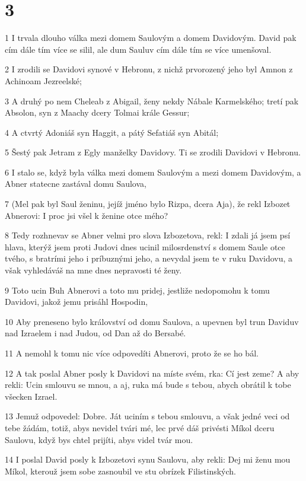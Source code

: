 \chapter{3}

\par 1 I trvala dlouho válka mezi domem Saulovým a domem Davidovým. David pak cím dále tím více se silil, ale dum Sauluv cím dále tím se více umenšoval.
\par 2 I zrodili se Davidovi synové v Hebronu, z nichž prvorozený jeho byl Amnon z Achinoam Jezreelské;
\par 3 A druhý po nem Cheleab z Abigail, ženy nekdy Nábale Karmelského; tretí pak Absolon, syn z Maachy dcery Tolmai krále Gessur;
\par 4 A ctvrtý Adoniáš syn Haggit, a pátý Sefatiáš syn Abitál;
\par 5 Šestý pak Jetram z Egly manželky Davidovy. Ti se zrodili Davidovi v Hebronu.
\par 6 I stalo se, když byla válka mezi domem Saulovým a mezi domem Davidovým, a Abner statecne zastával domu Saulova,
\par 7 (Mel pak byl Saul ženinu, jejíž jméno bylo Rizpa, dcera Aja), že rekl Izbozet Abnerovi: I proc jsi všel k ženine otce mého?
\par 8 Tedy rozhnevav se Abner velmi pro slova Izbozetova, rekl: I zdali já jsem psí hlava, kterýž jsem proti Judovi dnes ucinil milosrdenství s domem Saule otce tvého, s bratrími jeho i príbuznými jeho, a nevydal jsem te v ruku Davidovu, a však vyhledáváš na mne dnes nepravosti té ženy.
\par 9 Toto ucin Buh Abnerovi a toto mu pridej, jestliže nedopomohu k tomu Davidovi, jakož jemu prisáhl Hospodin,
\par 10 Aby preneseno bylo království od domu Saulova, a upevnen byl trun Daviduv nad Izraelem i nad Judou, od Dan až do Bersabé.
\par 11 A nemohl k tomu nic více odpovedíti Abnerovi, proto že se ho bál.
\par 12 A tak poslal Abner posly k Davidovi na míste svém, rka: Cí jest zeme? A aby rekli: Ucin smlouvu se mnou, a aj, ruka má bude s tebou, abych obrátil k tobe všecken Izrael.
\par 13 Jemuž odpovedel: Dobre. Ját uciním s tebou smlouvu, a však jedné veci od tebe žádám, totiž, abys nevidel tvári mé, lec prvé dáš privésti Míkol dceru Saulovu, když bys chtel prijíti, abys videl tvár mou.
\par 14 I poslal David posly k Izbozetovi synu Saulovu, aby rekli: Dej mi ženu mou Míkol, kterouž jsem sobe zasnoubil ve stu obrízek Filistinských.
